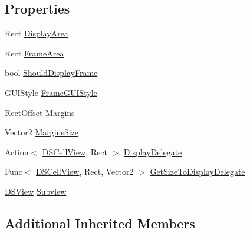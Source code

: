 \subsection*{Properties}
\begin{DoxyCompactItemize}
\item 
Rect \hyperlink{class_d_s_cell_view_a6066caadb7322c3ec4d2346ae7f05eb2}{Display\+Area}
\item 
Rect \hyperlink{class_d_s_cell_view_a8c4d002aee92cc360a4efedc99ae4457}{Frame\+Area}
\item 
bool \hyperlink{class_d_s_cell_view_a5b6801496214dc1e08fa673a3fd6aa57}{Should\+Display\+Frame}
\item 
G\+U\+I\+Style \hyperlink{class_d_s_cell_view_a8197fbd9d2a2107fc9419fba961dc6c1}{Frame\+G\+U\+I\+Style}
\item 
Rect\+Offset \hyperlink{class_d_s_cell_view_a8c1a26d5f17369dcf7b23995c34cbf57}{Margins}
\item 
Vector2 \hyperlink{class_d_s_cell_view_a5fc356837c8e03187f2f9da306c7cecb}{Margins\+Size}
\item 
Action$<$ \hyperlink{class_d_s_cell_view}{D\+S\+Cell\+View}, Rect $>$ \hyperlink{class_d_s_cell_view_aa147a836602429e730831128b84eb74b}{Display\+Delegate}
\item 
Func$<$ \hyperlink{class_d_s_cell_view}{D\+S\+Cell\+View}, Rect, Vector2 $>$ \hyperlink{class_d_s_cell_view_a430333bb1eb853cad8ca9ebbba63804d}{Get\+Size\+To\+Display\+Delegate}
\item 
\hyperlink{class_d_s_view}{D\+S\+View} \hyperlink{class_d_s_cell_view_a72bbdadd9c88872bd23bff06ff150cc5}{Subview}
\end{DoxyCompactItemize}
\subsection*{Additional Inherited Members}


